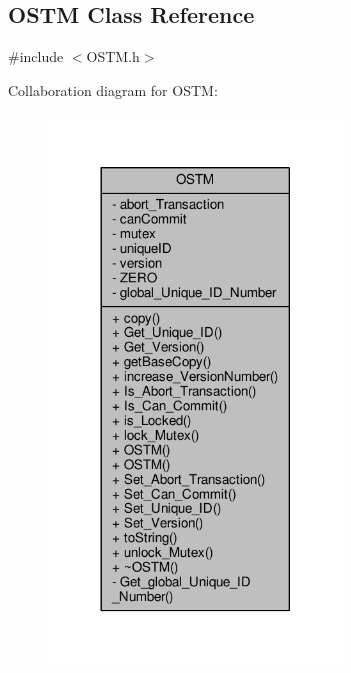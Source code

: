 \hypertarget{class_o_s_t_m}{}\subsection{O\+S\+TM Class Reference}
\label{class_o_s_t_m}


{\ttfamily \#include $<$O\+S\+T\+M.\+h$>$}



Collaboration diagram for O\+S\+TM\+:\nopagebreak
\begin{figure}[H]
\begin{center}
\leavevmode
\includegraphics[width=221pt]{class_o_s_t_m__coll__graph}
\end{center}
\end{figure}
